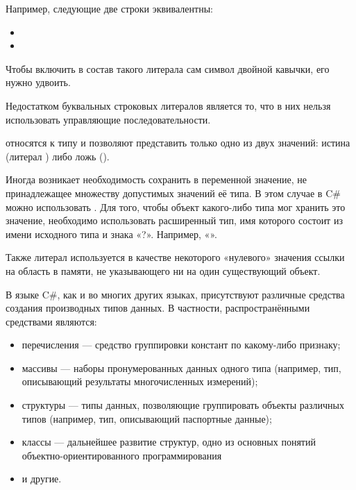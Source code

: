 Например, следующие две строки эквивалентны:
\begin{itemize}
\item{}
\item{}
\end{itemize}

Чтобы включить в состав такого литерала сам символ двойной кавычки,
его нужно удвоить.

Недостатком буквальных строковых литералов является то, что в них
нельзя использовать управляющие последовательности.


 относятся к типу
 и позволяют представить только одно из двух значений:
истина (литерал ) либо ложь ().


Иногда возникает необходимость сохранить в переменной значение, не
принадлежащее множеству допустимых значений её типа. В этом случае в
C\# можно использовать .  Для
того, чтобы объект какого-либо типа мог хранить это значение,
необходимо использовать расширенный тип, имя которого состоит из имени
исходного типа и знака «?». Например, «».

Также литерал  используется в качестве некоторого «нулевого» значения
ссылки на область в памяти, не указывающего ни на один существующий
объект.


В языке C\#, как и во многих других языках, присутствуют различные
средства создания производных типов данных. В частности, распространёнными
средствами являются:
\begin{itemize}
\item перечисления — средство группировки констант по какому-либо
  признаку;
\item массивы — наборы пронумерованных данных одного типа (например,
  тип, описывающий результаты многочисленных измерений);
\item структуры — типы данных, позволяющие группировать объекты
  различных типов (например, тип, описывающий паспортные данные);
\item классы — дальнейшее развитие структур, одно из основных понятий
  объектно-ориентированного программирования
\item и другие.
\end{itemize}

